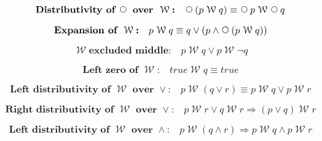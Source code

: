 \documentclass[12pt, fleqn, leqno]{article}
\newcommand{\impl}{\ensuremath{\Rightarrow}}        %
\newcommand{\Wait}{\;\mathcal{W}\;}
\newcommand{\Next}{\;\,\text{\raisebox{3.5pt}{\circle{6}}}}
\newcommand{\spacer}{\vspace{-30pt}}
\begin{document}
\spacer

\begin{equation}\label{E:waitNextDist}
\textbf{Distributivity of $\Next$ over $\Wait$:}\quad \Next (p \Wait q) \equiv \Next p \Wait \Next q
\end{equation}

\spacer

\begin{equation}\label{E:expansionWait}
\textbf{Expansion of $\Wait$:}\quad p \Wait q \equiv q \lor (p \land \Next (p \Wait q))
\end{equation}

\spacer

\begin{equation}\label{E:waitExcludedMiddle}
\Wait \textbf{excluded middle:}\quad p \Wait q \lor p\Wait \neg q
\end{equation}

\spacer

\begin{equation}\label{E:leftZeroWait}
\textbf{Left zero of $\Wait$:}\quad true \Wait q \equiv true
\end{equation}

\spacer

\begin{equation}\label{E:waitOrDist}
\textbf{Left distributivity of $\Wait$ over $\lor$:}\quad p \Wait (q \lor r) \equiv p \Wait q \lor p \Wait r
\end{equation}

\spacer

\begin{equation}\label{E:rightWaitOrDist}
\textbf{Right distributivity of $\Wait$ over $\lor$:}\quad p \Wait r \lor q \Wait r \impl (p \lor q) \Wait r
\end{equation}

\spacer

\begin{equation}\label{E:leftWaitAndDist}
\textbf{Left distributivity of $\Wait$ over $\land$:}\quad p \Wait (q \land r) \impl p \Wait q \land p \Wait r
\end{equation}
\end{document}
